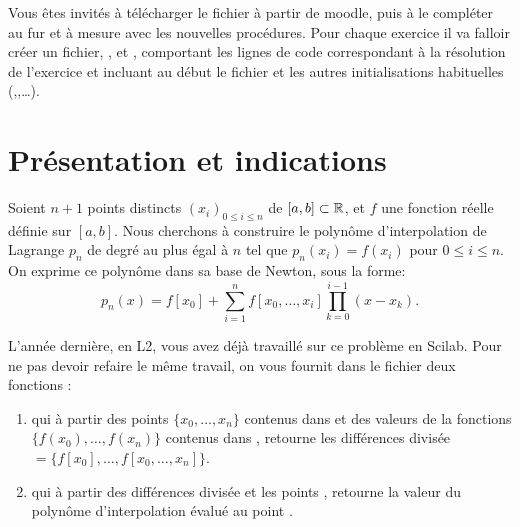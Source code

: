 \documentclass[a4paper,12pt,reqno]{amsart}
\begin{document}

Vous êtes invités à télécharger le fichier  à partir de moodle, puis à le compléter au fur et à mesure avec les nouvelles procédures. Pour chaque exercice il va falloir créer un fichier, ,  et , comportant les lignes de code correspondant à la résolution de l'exercice et incluant au début le fichier  et les autres initialisations habituelles (,,\ldots).



\section{Présentation et indications}

Soient $n+1$ points distincts $(x_i)_{0 \leq i \leq n}$ de $[a,b] \subset \mathbb{R}$, et $f$ une fonction réelle définie sur $[a,b]$. Nous cherchons à construire le polynôme d'interpolation de Lagrange $p_n$ de degré au plus égal à $n$ tel que $p_n(x_i)=f(x_i)$ pour $ 0 \leq i \leq n$. On exprime ce polynôme dans sa base de Newton, sous la forme:
    $$
        p_n(x)= f[x_0]+ \sum_{i=1}^n f[x_0,\ldots,x_i] \prod_{k=0}^{i-1} (x-x_k).
    $$

L'année dernière, en L2, vous avez déjà travaillé sur ce problème en Scilab. Pour ne pas devoir refaire le même travail, on vous fournit dans le fichier  deux fonctions :
\begin{enumerate}
     \item {} qui à partir des points $\{x_0,\ldots,x_n\}$ contenus dans  et des valeurs de la fonctions $\{f(x_0),\ldots,f(x_n)\}$ contenus dans , retourne les différences divisée $=\{f[x_0],\ldots,f[x_0,\ldots,x_n]\}$.
     \item {} qui à partir des différences divisée  et les points , retourne la valeur du polynôme d'interpolation évalué au point .
 \end{enumerate}


\end{document}
